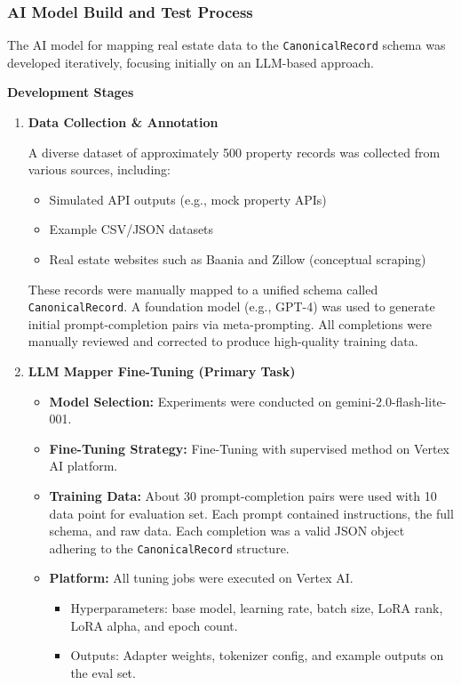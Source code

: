 \subsubsection{AI Model Build and Test Process}
The AI model for mapping real estate data to the \texttt{CanonicalRecord} schema was developed iteratively, focusing initially on an LLM-based approach.

\textbf{Development Stages}
\begin{enumerate}
    \item \textbf{Data Collection \& Annotation}

    A diverse dataset of approximately 500 property records was collected from various sources, including:
    \begin{itemize}
        \item Simulated API outputs (e.g., mock property APIs)
        \item Example CSV/JSON datasets
        \item Real estate websites such as Baania and Zillow (conceptual scraping)
    \end{itemize}

    These records were manually mapped to a unified schema called \texttt{CanonicalRecord}. A foundation model (e.g., GPT-4) was used to generate initial prompt-completion pairs via meta-prompting. All completions were manually reviewed and corrected to produce high-quality training data.

    \item \textbf{LLM Mapper Fine-Tuning (Primary Task)}

    \begin{itemize}
        \item \textbf{Model Selection:} Experiments were conducted on gemini-2.0-flash-lite-001.
        \item \textbf{Fine-Tuning Strategy:} Fine-Tuning with supervised method on Vertex AI platform.
        \item \textbf{Training Data:} About 30 prompt-completion pairs were used with 10 data point for evaluation set. Each prompt contained instructions, the full schema, and raw data. Each completion was a valid JSON object adhering to the \texttt{CanonicalRecord} structure.
        \item \textbf{Platform:} All tuning jobs were executed on Vertex AI.
            \begin{itemize}
                \item Hyperparameters: base model, learning rate, batch size, LoRA rank, LoRA alpha, and epoch count.
                \item Outputs: Adapter weights, tokenizer config, and example outputs on the eval set.
            \end{itemize}
    \end{itemize}


\end{enumerate}
